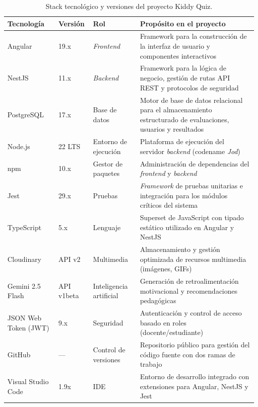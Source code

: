 \begin{table}[H]
\centering
\caption{Stack tecnológico y versiones del proyecto Kiddy Quiz.}
\label{tab:versiones}
\footnotesize
\renewcommand{\arraystretch}{1.3}
\begin{tabularx}{\textwidth}{|p{3.5cm}|p{2.2cm}|p{2.2cm}|X|}
\hline
\rowcolor{headblue}
\textbf{Tecnología} & \textbf{Versión} & \textbf{Rol} & \textbf{Propósito en el proyecto} \\\hline
Angular & 19.x & \textit{Frontend} & Framework para la construcción de la interfaz de usuario y componentes interactivos \\\hline
NestJS & 11.x & \textit{Backend} & Framework para la lógica de negocio, gestión de rutas API REST y protocolos de seguridad \\\hline
PostgreSQL & 17.x & Base de datos & Motor de base de datos relacional para el almacenamiento estructurado de evaluaciones, usuarios y resultados \\\hline
Node.js & 22 LTS & Entorno de ejecución & Plataforma de ejecución del servidor \textit{backend} (codename \textit{Jod}) \\\hline
npm & 10.x & Gestor de paquetes & Administración de dependencias del \textit{frontend} y \textit{backend} \\\hline
Jest & 29.x & Pruebas & \textit{Framework} de pruebas unitarias e integración para los módulos críticos del sistema \\\hline
TypeScript & 5.x & Lenguaje & Superset de JavaScript con tipado estático utilizado en Angular y NestJS \\\hline
Cloudinary & API v2 & Multimedia & Almacenamiento y gestión optimizada de recursos multimedia (imágenes, GIFs) \\\hline
Gemini 2.5 Flash & API v1beta & Inteligencia artificial & Generación de retroalimentación motivacional y recomendaciones pedagógicas \\\hline
JSON Web Token (JWT) & 9.x & Seguridad & Autenticación y control de acceso basado en roles (docente/estudiante) \\\hline
GitHub & --- & Control de versiones & Repositorio público para gestión del código fuente con dos ramas de trabajo \\\hline
Visual Studio Code & 1.9x & IDE & Entorno de desarrollo integrado con extensiones para Angular, NestJS y Jest \\\hline
\end{tabularx}
\end{table}
\fuenteautor

